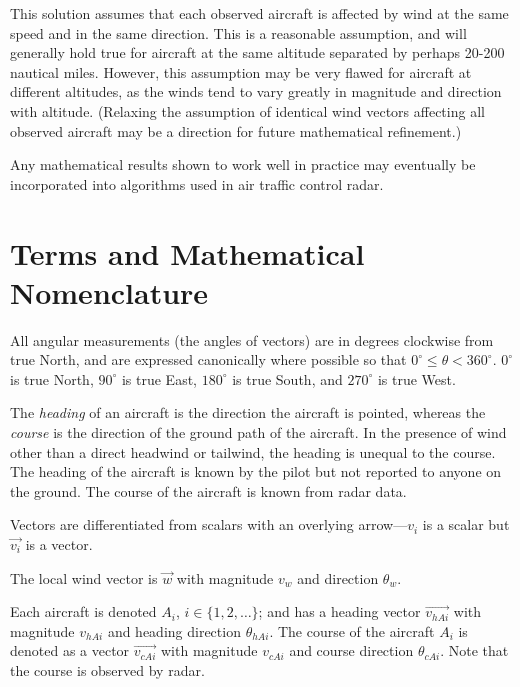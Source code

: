 \documentclass[letterpaper,10pt,titlepage]{article}
\begin{document}
This solution assumes that each observed aircraft is affected by wind at the
same speed and in the same direction.  This is a reasonable assumption, 
and will generally
hold true for aircraft at the same altitude separated by perhaps 
20-200 nautical miles.  However, this assumption may be very flawed
for aircraft at different altitudes, as the winds tend to vary greatly
in magnitude and direction with altitude.
(Relaxing the assumption of identical wind vectors affecting all observed aircraft
may be a direction for future mathematical refinement.)

Any mathematical results shown to work well in practice may eventually be
incorporated into algorithms used in air traffic control radar.


\section{Terms and Mathematical Nomenclature}
\label{snom0}

All angular measurements (the angles of vectors) are in degrees clockwise from true
North, and are expressed canonically where possible so that
$0^\circ \leq \theta < 360^\circ$.   $0^\circ$ is true North, $90^\circ$ is true East, 
$180^\circ$ is true South, and $270^\circ$ is true West.

The \emph{heading} of an aircraft is the direction the aircraft is pointed, whereas the
\emph{course} is the direction of the ground path of the aircraft.  In the presence
of wind other than a direct headwind or tailwind, the heading is unequal to the course.
The heading of the aircraft is known by the pilot but not reported to anyone on the ground.
The course of the aircraft is known from radar data.

Vectors are differentiated from scalars with an overlying arrow---$v_i$ is a scalar
but $\vec{v_i}$ is a vector. 

The local wind vector is $\vec{w}$ with magnitude $v_w$ and direction
$\theta_w$.

Each aircraft is denoted $A_i$, $i \in \{1, 2, \ldots{} \}$; and has a heading vector
$\vec{v_{hAi}}$ with magnitude $v_{hAi}$ and heading direction $\theta_{hAi}$.
The course of the aircraft $A_i$ is denoted as a vector $\vec{v_{cAi}}$ with magnitude
$v_{cAi}$ and course direction $\theta_{cAi}$.  Note that the course is observed by radar.

\end{document}
